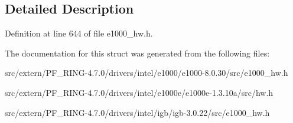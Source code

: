 \subsection{Detailed Description}


Definition at line 644 of file e1000\_\-hw.h.



The documentation for this struct was generated from the following files:\begin{DoxyCompactItemize}
\item 
src/extern/PF\_\-RING-\/4.7.0/drivers/intel/e1000/e1000-\/8.0.30/src/e1000\_\-hw.h\item 
src/extern/PF\_\-RING-\/4.7.0/drivers/intel/e1000e/e1000e-\/1.3.10a/src/hw.h\item 
src/extern/PF\_\-RING-\/4.7.0/drivers/intel/igb/igb-\/3.0.22/src/e1000\_\-hw.h\end{DoxyCompactItemize}
